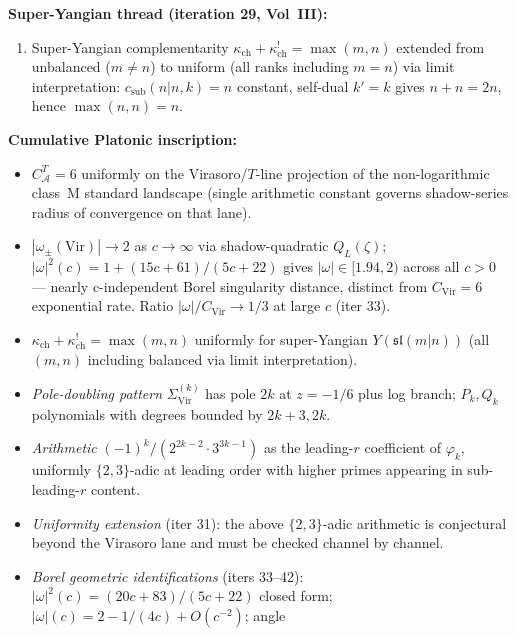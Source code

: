 \documentclass[11pt]{article}
\newcommand{\cA}{\mathcal{A}}
\begin{document}
\textbf{Super-Yangian thread (iteration 29, Vol~III):}
\begin{enumerate}
  \item[\textbf{Iter 29}] Super-Yangian complementarity $\kappa_{\mathrm{ch}}
        + \kappa_{\mathrm{ch}}^! = \max(m, n)$ extended from
        unbalanced ($m \ne n$) to uniform (all ranks including
        $m = n$) via limit interpretation: $c_{\mathrm{sub}}(n|n, k) =
        n$ constant, self-dual $k' = k$ gives $n + n = 2n$, hence
        $\max(n, n) = n$.
\end{enumerate}

\textbf{Cumulative Platonic inscription:}
\begin{itemize}
  \item \emph{$C^T_\cA = 6$} uniformly on the Virasoro/$T$-line
        projection of the non-logarithmic class~M standard landscape (single
        arithmetic constant governs shadow-series radius of
        convergence on that lane).
  \item \emph{$|\omega_\pm(\mathrm{Vir})| \to 2$} as $c \to \infty$ via
        shadow-quadratic $Q_L(\zeta)$; $|\omega|^2(c) = 1 +
        (15c + 61)/(5c + 22)$ gives $|\omega| \in [1.94, 2)$
        across all $c > 0$ — nearly c-independent Borel
        singularity distance, distinct from $C_{\mathrm{Vir}} = 6$
        exponential rate. Ratio $|\omega|/C_{\mathrm{Vir}} \to 1/3$ at
        large $c$ (iter 33).
  \item \emph{$\kappa_{\mathrm{ch}} + \kappa_{\mathrm{ch}}^! =
        \max(m, n)$} uniformly for super-Yangian
        $Y(\mathfrak{sl}(m|n))$ (all $(m, n)$ including balanced
        via limit interpretation).
  \item \emph{Pole-doubling pattern} $\Sigma_{\mathrm{Vir}}^{(k)}$ has pole
        $2k$ at $z = -1/6$ plus log branch; $P_k, Q_k$
        polynomials with degrees bounded by $2k + 3, 2k$.
  \item \emph{Arithmetic} $(-1)^k/(2^{2k-2} \cdot 3^{3k-1})$ as
        the leading-$r$ coefficient of $\varphi_k$, uniformly
        $\{2, 3\}$-adic at leading order with higher primes
        appearing in sub-leading-$r$ content.
  \item \emph{Uniformity extension} (iter 31): the above
        $\{2, 3\}$-adic arithmetic is conjectural beyond the
        Virasoro lane and must be checked channel by channel.
  \item \emph{Borel geometric identifications} (iters 33--42):
        $|\omega|^2(c) = (20c + 83)/(5c + 22)$ closed form;
        $|\omega|(c) = 2 - 1/(4c) + O(c^{-2})$; angle

\end{itemize}
\end{document}
